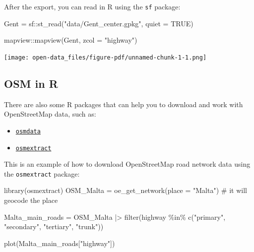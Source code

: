 \documentclass[
  letterpaper,
  DIV=11,
  numbers=noendperiod]{scrreprt}
\newenvironment{Shaded}{\begin{snugshade}}{\end{snugshade}}
\newcommand{\AttributeTok}[1]{\textcolor[rgb]{0.40,0.45,0.13}{#1}}
\newcommand{\CommentTok}[1]{\textcolor[rgb]{0.37,0.37,0.37}{#1}}
\newcommand{\ConstantTok}[1]{\textcolor[rgb]{0.56,0.35,0.01}{#1}}
\newcommand{\FunctionTok}[1]{\textcolor[rgb]{0.28,0.35,0.67}{#1}}
\newcommand{\NormalTok}[1]{\textcolor[rgb]{0.00,0.23,0.31}{#1}}
\newcommand{\OtherTok}[1]{\textcolor[rgb]{0.00,0.23,0.31}{#1}}
\newcommand{\SpecialCharTok}[1]{\textcolor[rgb]{0.37,0.37,0.37}{#1}}
\newcommand{\StringTok}[1]{\textcolor[rgb]{0.13,0.47,0.30}{#1}}
\providecommand{\tightlist}{%
  \setlength{\itemsep}{0pt}\setlength{\parskip}{0pt}}\usepackage{longtable,booktabs,array}
\begin{document}
After the export, you can read in R using the \texttt{sf} package:

\begin{Shaded}
\begin{Highlighting}[]
\NormalTok{Gent }\OtherTok{=}\NormalTok{ sf}\SpecialCharTok{::}\FunctionTok{st\_read}\NormalTok{(}\StringTok{"data/Gent\_center.gpkg"}\NormalTok{, }\AttributeTok{quiet =} \ConstantTok{TRUE}\NormalTok{)}

\NormalTok{mapview}\SpecialCharTok{::}\FunctionTok{mapview}\NormalTok{(Gent, }\AttributeTok{zcol =} \StringTok{"highway"}\NormalTok{)}
\end{Highlighting}
\end{Shaded}

\texttt{[image: open-data\_files/figure-pdf/unnamed-chunk-1-1.png]}

\subsection{OSM in R}\label{osm-in-r}

There are also some R packages that can help you to download and work
with OpenStreetMap data, such as:

\begin{itemize}
\tightlist
\item
  \href{https://cran.r-project.org/web/packages/osmdata/index.html}{\texttt{osmdata}}
\item
  \href{https://docs.ropensci.org/osmextract}{\texttt{osmextract}}
\end{itemize}

This is an example of how to download OpenStreetMap road network data
using the \texttt{osmextract} package:

\begin{Shaded}
\begin{Highlighting}[]
\FunctionTok{library}\NormalTok{(osmextract)}
\NormalTok{OSM\_Malta }\OtherTok{=} \FunctionTok{oe\_get\_network}\NormalTok{(}\AttributeTok{place =} \StringTok{"Malta"}\NormalTok{) }\CommentTok{\# it will geocode the place}

\NormalTok{Malta\_main\_roads }\OtherTok{=}\NormalTok{ OSM\_Malta }\SpecialCharTok{|\textgreater{}} 
  \FunctionTok{filter}\NormalTok{(highway }\SpecialCharTok{\%in\%} \FunctionTok{c}\NormalTok{(}\StringTok{"primary"}\NormalTok{, }\StringTok{"secondary"}\NormalTok{, }\StringTok{"tertiary"}\NormalTok{, }\StringTok{"trunk"}\NormalTok{))}

\FunctionTok{plot}\NormalTok{(Malta\_main\_roads[}\StringTok{"highway"}\NormalTok{])}
\end{Highlighting}
\end{Shaded}
\end{document}
